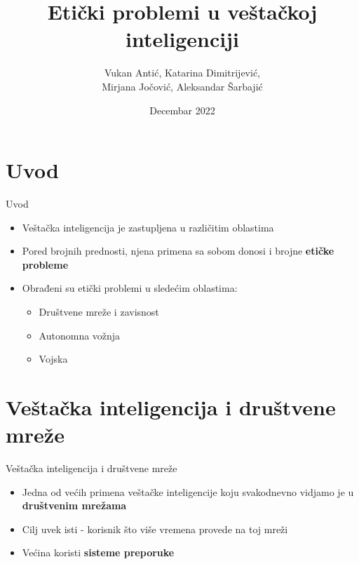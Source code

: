 \documentclass[14pt, aspectratio=169]{beamer}
\title{Etički problemi u veštačkoj inteligenciji}
\author{Vukan Antić, Katarina Dimitrijević, \\ Mirjana Jočović, Aleksandar Šarbajić}
\date{Decembar 2022}
\begin{document}
\maketitle

\section{Uvod}

\begin{frame}{Uvod}
    \begin{itemize}
        \item Veštačka inteligencija je zastupljena u različitim oblastima
    \end{itemize}
    \begin{itemize}
        \item Pored brojnih prednosti, njena primena sa sobom donosi i brojne \textbf{etičke probleme}
    \end{itemize}
    \begin{itemize}
        \item Obrađeni su etički problemi u sledećim oblastima:
        \begin{itemize}
            \item Društvene mreže i zavisnost
        \end{itemize}
        \begin{itemize}
            \item Autonomna vožnja
        \end{itemize}
        \begin{itemize}
            \item Vojska
        \end{itemize}
    \end{itemize}
    
\end{frame}

\section{Veštačka inteligencija i društvene mreže}

\begin{frame}{Veštačka inteligencija i društvene mreže}
    \begin{itemize}
        \item Jedna od većih primena veštačke inteligencije koju svakodnevno vidjamo je u \textbf{društvenim mrežama}
    \end{itemize}
    \begin{itemize}
        \item Cilj uvek isti - korisnik što više vremena provede na toj mreži
    \end{itemize}
    \begin{itemize}
        \item Većina koristi \textbf{sisteme preporuke}
    \end{itemize}
\end{frame}
\end{document}

